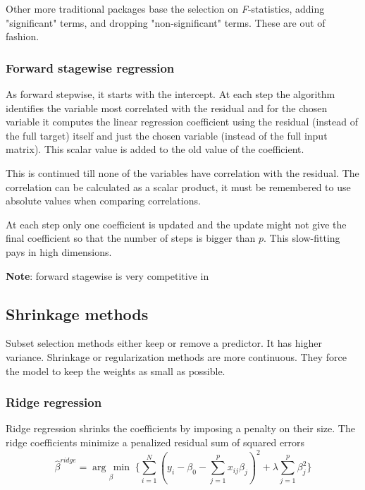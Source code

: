 \documentclass[12pt, letterpaper]{article}
\theoremstyle{definition}
\newcommand{\argmin}[1]{\underset{#1}{\operatorname{arg}\,\operatorname{min}}\;}
\begin{document}
Other more traditional packages base the selection on \textit{F}-statistics, adding "significant" terms, and dropping "non-significant" terms. These are out of fashion.

\subsubsection{Forward stagewise regression}
As forward stepwise, it starts with the intercept. At each step the algorithm identifies the variable most correlated with the residual and for the chosen variable it computes the linear regression coefficient using the residual (instead of the full target) itself and just the chosen variable (instead of the full input matrix). This scalar value is added to the old value of the coefficient.

This is continued till none of the variables have correlation with the residual. The correlation can be calculated as a scalar product, it must be remembered to use absolute values when comparing correlations.

At each step only one coefficient is updated and the update might not give the final coefficient so that the number of steps is bigger than $p$. This slow-fitting pays in high dimensions.

\textbf{Note}: forward stagewise is very competitive in 

\subsection{Shrinkage methods}
Subset selection methods either keep or remove a predictor. It has higher variance. Shrinkage or regularization methods are more continuous. They force the model to keep the weights as small as possible.


\subsubsection{Ridge regression}
Ridge regression shrinks the coefficients by imposing a penalty on their size.	 The ridge coefficients minimize a penalized residual sum of squared errors
\begin{equation}
\label{bridge}
\hat{\beta}^{ridge} = \argmin{\beta} \Bigg\lbrace \sum_{i=1}^N \left( y_i -  \beta_0 - \sum_{j=1}^p x_{ij} \beta_j\right)^2+ \lambda \sum_{j=1}^p \beta_j^2 \Bigg\rbrace
\end{equation}
\end{document}
